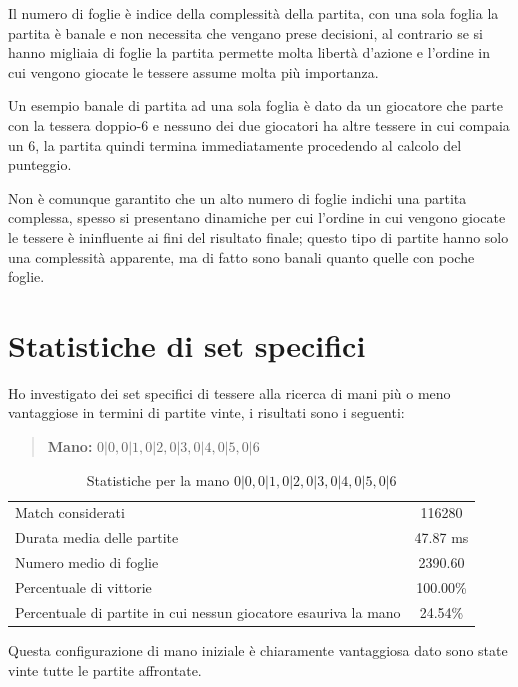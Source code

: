 \documentclass[a4paper,12pt]{report} %
\begin{document}
Il numero di foglie è indice della complessità della partita, con una sola foglia la partita è banale e non necessita che vengano prese decisioni, al contrario se si hanno migliaia di foglie la partita permette molta libertà d'azione e l'ordine in cui vengono giocate le tessere assume molta più importanza.


Un esempio banale di partita ad una sola foglia è dato da un giocatore che parte con la tessera doppio-6 e nessuno dei due giocatori ha altre tessere in cui compaia un 6, la partita quindi termina immediatamente procedendo al calcolo del punteggio.


Non è comunque garantito che un alto numero di foglie indichi una partita complessa, spesso si presentano dinamiche per cui l'ordine in cui vengono giocate le tessere è ininfluente ai fini del risultato finale; questo tipo di partite hanno solo una complessità apparente, ma di fatto sono banali quanto quelle con poche foglie.


\section{Statistiche di set specifici}

Ho investigato dei set specifici di tessere alla ricerca di mani più o meno vantaggiose in termini di partite vinte, i risultati sono i seguenti:


\begin{quote}
    \textbf{Mano:} \(0|0, 0|1, 0|2, 0|3, 0|4, 0|5, 0|6\)
\end{quote}

\begin{table}[h!]
    \centering
    \begin{tabular}{|l|c|}
        \hline
        Match considerati & 116280 \\
        Durata media delle partite & 47.87 ms \\
        Numero medio di foglie & 2390.60 \\
        Percentuale di vittorie & 100.00\% \\
        Percentuale di partite in cui nessun giocatore esauriva la mano & 24.54\% \\
        \hline
    \end{tabular}
    \caption{Statistiche per la mano \(0|0, 0|1, 0|2, 0|3, 0|4, 0|5, 0|6\)}
    \label{tab:stats_1}
\end{table}

Questa configurazione di mano iniziale è chiaramente vantaggiosa dato sono state vinte tutte le partite affrontate.
\end{document}
